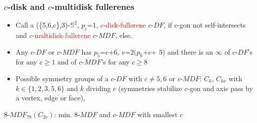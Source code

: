 \documentclass{beamer}
\begin{document}
\begin{frame}\frametitle{$c$-disk and $c$-multidisk fullerenes}
\vspace{-2mm}

\begin{itemize}
\item Call a (\{5,6,c\},3)-$\mathbb{S}^2$, 
$p_c$=$1$, 
  \textcolor{red}{$c$-disk-fullerene} $c$-$DF$,
if  $c$-gon  not self-intersects and 
\textcolor{red}{$c$-multidisk-fullerene} $c$-$MDF$, else.
\item Any 
$c$-$DF$ or
$c$-$MDF$ has $p_5$=$c$+$6$, $v$=$2(p_6$+$c$+ $5)$ 
and  there is an 
$\infty$ of  $c$-$DF$'s for   any $c$$\ge$$ 1$ and of  $c$-$MDF$'s for   any $c$$\ge$$ 8$



\item Possible symmetry groups of a 
$c$-$DF$  with  $c$$\neq$$5,6$  
or  $c$-$MDF$:  $C_k$, $C_{k\nu}$ with $k\in \{1,2,3,5,6\}$ and $k$ dividing $c$
(symmetries 
stabilize $c$-gon and axis pass by a vertex, edge or face),
\end{itemize}



\begin{minipage}[b]{9.4cm}
\centering
{}\par
$8$-$MDF_{78}(C_{2\nu})$: min. $8$-$MDF$ and $c$-$MDF$ with smallest $c$
\end{minipage}
\end{frame}
\end{document}
